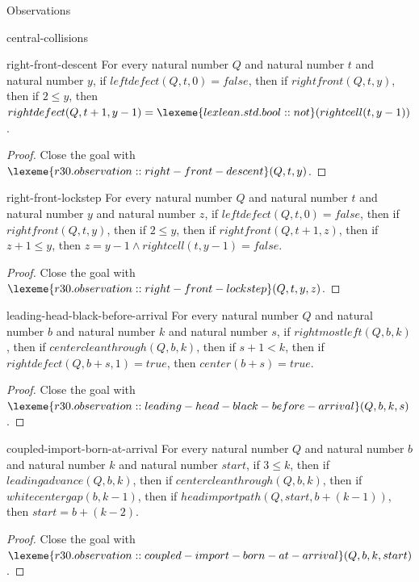 \begin{lexlean}{Observations}
\begin{section}{central-collisions}
\begin{theorem}{right-front-descent}
For every natural number \(Q\) and natural number \(t\) and natural number \(y\), if \(leftdefect(Q, t, 0) = false\), then if \(rightfront(Q, t, y)\), then if \(2 ≤ y\), then \(rightdefect(Q, t + 1, y - 1) = \lexeme{lexlean.std.bool::not}(rightcell(t, y - 1))\).
\begin{proof}
Close the goal with \(\lexeme{r30.observation::right-front-descent}(Q, t, y)\).
\end{proof}
\end{theorem}

\begin{theorem}{right-front-lockstep}
For every natural number \(Q\) and natural number \(t\) and natural number \(y\) and natural number \(z\), if \(leftdefect(Q, t, 0) = false\), then if \(rightfront(Q, t, y)\), then if \(2 ≤ y\), then if \(rightfront(Q, t + 1, z)\), then if \(z + 1 ≤ y\), then \(z = y - 1 ∧ rightcell(t, y - 1) = false\).
\begin{proof}
Close the goal with \(\lexeme{r30.observation::right-front-lockstep}(Q, t, y, z)\).
\end{proof}
\end{theorem}

\begin{theorem}{leading-head-black-before-arrival}
For every natural number \(Q\) and natural number \(b\) and natural number \(k\) and natural number \(s\), if \(rightmostleft(Q, b, k)\), then if \(centercleanthrough(Q, b, k)\), then if \(s + 1 < k\), then if \(rightdefect(Q, b + s, 1) = true\), then \(center(b + s) = true\).
\begin{proof}
Close the goal with \(\lexeme{r30.observation::leading-head-black-before-arrival}(Q, b, k, s)\).
\end{proof}
\end{theorem}

\begin{theorem}{coupled-import-born-at-arrival}
For every natural number \(Q\) and natural number \(b\) and natural number \(k\) and natural number \(start\), if \(3 ≤ k\), then if \(leadingadvance(Q, b, k)\), then if \(centercleanthrough(Q, b, k)\), then if \(whitecentergap(b, k - 1)\), then if \(headimportpath(Q, start, b + (k - 1))\), then \(start = b + (k - 2)\).
\begin{proof}
Close the goal with \(\lexeme{r30.observation::coupled-import-born-at-arrival}(Q, b, k, start)\).
\end{proof}
\end{theorem}


\end{section}
\end{lexlean}
